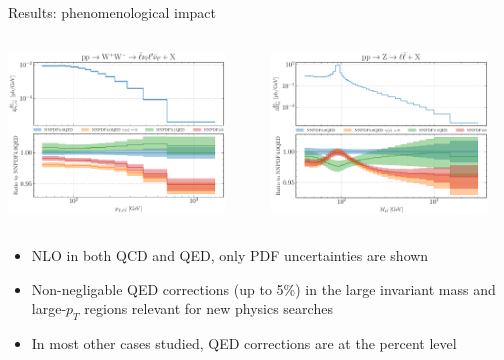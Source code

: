 \documentclass[aspectratio=169, 9pt,t]{beamer}
\begin{document}
\begin{frame}{Results: phenomenological impact}
  \begin{columns}[T]
    \begin{column}{0.49\textwidth}
      \includegraphics[width=0.9\textwidth]{figures/NNPDF_WPWM_14TEV_40_PHENO-internal.pdf}
    \end{column}
    \begin{column}{0.49\textwidth}
      \includegraphics[width=0.9\textwidth]{figures/NNPDF_DY_14TEV_40_PHENO-internal.pdf}
    \end{column}
  \end{columns}

  \vspace*{1em}
  \begin{itemize}
    \item NLO in both QCD and QED, only PDF uncertainties are shown
    \item Non-negligable QED corrections (up to 5\%) in the large invariant mass and large-$p_T$ regions relevant for new physics searches
    \item In most other cases studied, QED corrections are at the percent level
  \end{itemize}
\end{frame}
\end{document}
